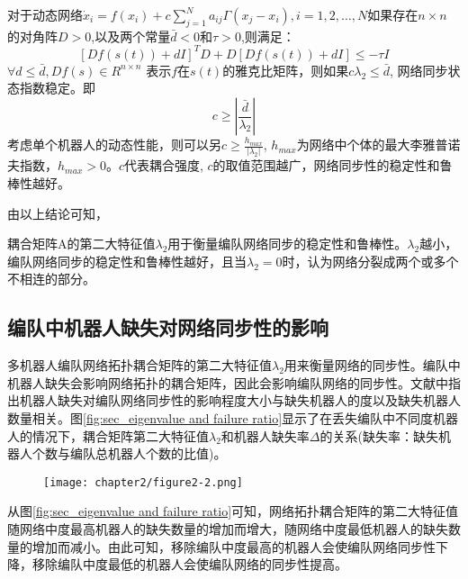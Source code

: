 对于动态网络$\dot{x}_i = f(x_i) + c\sum_{j=1}^N a_{ij}\Gamma (x_j-x_i), i=1,2,\dots,N$如果存在$n \times n$ 的对角阵$D>0$,以及两个常量$\bar{d}<0$和$\tau>0$,则满足：\\
\begin{equation}
	{\left[ Df(s(t))+dI\right]}^TD + D\left[Df(s(t)) + dI\right] \leq -\tau I
\end{equation}
$\forall d \leq \bar{d}, Df(s) \in R^{n \times n}$ 表示$f$在$s(t)$的雅克比矩阵，则如果$c\lambda_2 \leq \bar{d}$, 网络同步状态指数稳定。即\\
\begin{equation}
	c \geq |\frac{\bar{d}}{\lambda_2}|
\end{equation}
考虑单个机器人的动态性能，则可以另$c \geq \frac{h_{max}}{|\lambda_2|}$, $h_{max}$为网络中个体的最大李雅普诺夫指数，$h_{max}>0$。$c$代表耦合强度, $c$的取值范围越广，网络同步性的稳定性和鲁棒性越好。

由以上结论可知，
\begin{lem}
\label{lem:lambda2}
	耦合矩阵A的第二大特征值$\lambda_2$用于衡量编队网络同步的稳定性和鲁棒性。$\lambda_2$越小，编队网络同步的稳定性和鲁棒性越好，且当$\lambda_2 = 0$时，认为网络分裂成两个或多个不相连的部分\supercite{li2003synchronization}。
\end{lem}

\subsection{编队中机器人缺失对网络同步性的影响}
多机器人编队网络拓扑耦合矩阵的第二大特征值$\lambda_2$用来衡量网络的同步性。编队中机器人缺失会影响网络拓扑的耦合矩阵，因此会影响编队网络的同步性。文献\parencite{张飞2008移动机器人覆盖问题的研究}中指出机器人缺失对编队网络同步性的影响程度大小与缺失机器人的度以及缺失机器人数量相关。图\ref{fig:sec_eigenvalue and failure ratio}显示了在丢失编队中不同度机器人的情况下，耦合矩阵第二大特征值$\lambda_2$和机器人缺失率$\Delta$的关系(缺失率：缺失机器人个数与编队总机器人个数的比值)。
\begin{figure}[!htbp]
	\centering
	\texttt{[image: chapter2/figure2-2.png]}
\end{figure}
从图\ref{fig:sec_eigenvalue and failure ratio}可知，网络拓扑耦合矩阵的第二大特征值随网络中度最高机器人的缺失数量的增加而增大，随网络中度最低机器人的缺失数量的增加而减小。由此可知，移除编队中度最高的机器人会使编队网络同步性下降，移除编队中度最低的机器人会使编队网络的同步性提高。

